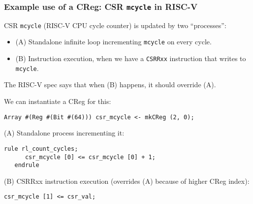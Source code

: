 \begin{frame}[fragile]
\frametitle{Example use of a CReg: CSR {\tt mcycle} in RISC-V}

\footnotesize

CSR {\tt mcycle} (RISC-V CPU cycle counter) is updated by two ``processes'':

\begin{itemize}

 \item (A) Standalone infinite loop incrementing {\tt mcycle} on every cycle.

 \item (B) Instruction execution, when we have a {\tt CSRRxx} instruction
           that writes to {\tt mcycle}.
\end{itemize}

The RISC-V spec says that when (B) happens, it should override (A).

\PAUSE{\vspace{5ex}}

We can instantiate a CReg for this:

\vspace{1ex}

\begin{Verbatim}[frame=single, label=from src\_Common/CSRs.bsv]
   Array #(Reg #(Bit #(64))) csr_mcycle <- mkCReg (2, 0);
\end{Verbatim}

\vspace{2ex}

(A) Standalone process incrementing it:

\vspace{1ex}

\begin{Verbatim}[frame=single, label=from src\_Common/CSRs.bsv]
   rule rl_count_cycles;
      csr_mcycle [0] <= csr_mcycle [0] + 1;
   endrule
\end{Verbatim}

\vspace{2ex}

(B) CSRRxx instruction execution (overrides (A) because of higher CReg index):

\vspace{1ex}

\begin{Verbatim}[frame=single, label=from src\_Common/CSRs.bsv in function fav\_csr\_write()]
   csr_mcycle [1] <= csr_val;
\end{Verbatim}

\end{frame}

